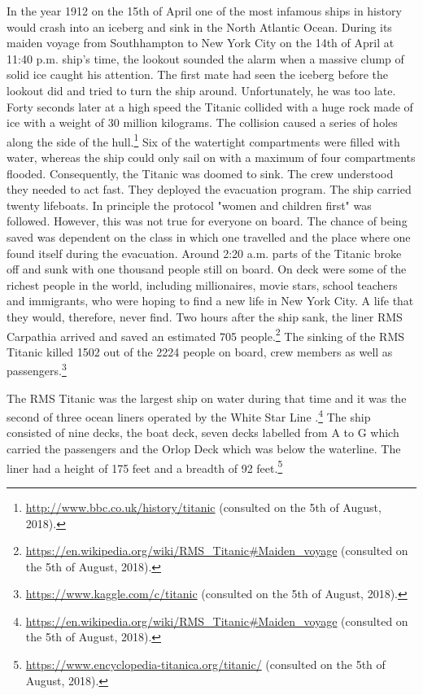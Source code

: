 \documentclass[11pt]{article}
\begin{document}
In the year 1912 on the 15th of April one of the most infamous ships in history would crash into an iceberg and sink in the North Atlantic Ocean. During its maiden voyage from Southhampton to New York City on the 14th of April at 11:40 p.m. ship's time, the lookout sounded the alarm  when a massive clump of solid ice caught his attention. The first mate had seen the iceberg before the lookout did and tried to turn the ship around. Unfortunately, he was too late. Forty seconds later at a high speed the Titanic collided with a huge rock made of ice with a weight of 30 million kilograms. The collision caused a series of holes along the side of the hull.\footnote{\url{http://www.bbc.co.uk/history/titanic} (consulted on the 5th of August, 2018).} Six of the watertight compartments were filled with water, whereas the ship could only sail on with a maximum of four compartments flooded. Consequently, the Titanic was doomed to sink. The crew understood they needed to act fast. They deployed the evacuation program. The ship carried twenty lifeboats. In principle the protocol "women and children first" was followed. However, this was not true for everyone on board. The chance of being saved was  dependent on the class in which one travelled and the place where one found itself during the evacuation. Around 2:20 a.m. parts of the Titanic broke off and sunk with one thousand people still on board. On deck were some of the richest people in the world, including millionaires, movie stars, school teachers and immigrants, who were hoping to find a new life in New York City. A life that they would, therefore, never find. Two hours after the ship sank, the liner RMS Carpathia arrived and saved an estimated 705 people.\footnote{\url{https://en.wikipedia.org/wiki/RMS\_Titanic\#Maiden\_voyage} (consulted on the 5th of August, 2018).} The sinking of the RMS Titanic killed 1502 out of the 2224 people on board, crew members as well as passengers.\footnote{\url{https://www.kaggle.com/c/titanic} (consulted on the 5th of August, 2018).}

The RMS Titanic was the largest ship on water during that time and it was the second of three  ocean liners operated by the White Star Line .\footnote{\url{https://en.wikipedia.org/wiki/RMS\_Titanic\#Maiden\_voyage} (consulted on the 5th of August, 2018).} The ship consisted of nine decks, the boat deck, seven decks labelled from A to G which carried the passengers and the Orlop Deck which was below the waterline. The liner had a height of 175 feet and a breadth of 92 feet.\footnote{\url{https://www.encyclopedia-titanica.org/titanic/} (consulted on the 5th of August, 2018).} 
\end{document}
